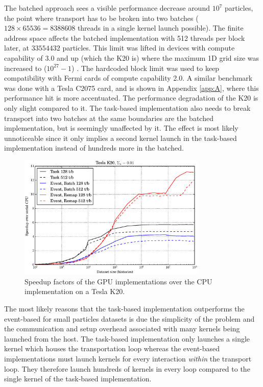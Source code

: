 The batched approach sees a visible performance decrease around $10^7$ particles, the point where transport has to be broken into two batches ($128\times65536=8388608$ threads in a single kernel launch possible).  The finite address space affects the batched implementation with 512 threads per block later, at $33554432$ particles.  This limit was lifted in devices with compute capability of 3.0 and up (which the K20 is) where the maximum 1D grid size was increased to ($10^{27}-1$) \cite{cuda}.  The hardcoded block limit was used to keep compatibility with Fermi cards of compute capability 2.0.  A similar benchmark was done with a Tesla C2075 card, and is shown in Appendix \ref{app:A}, where this performance hit is more accentuated.  The performance degradation of the K20 is only slight compared to it.   The task-based implementation also needs to break transport into two batches at the same boundaries are the batched implementation, but is seemingly unaffected by it.  The effect is most likely unnoticeable since it only implies a second kernel launch in the task-based implementation instead of hundreds more in the batched.

\begin{figure}[h!] 
  \centering
    \includegraphics[width=0.8\textwidth]{graphics/prelim_speedup_001_k20.eps}
     \caption{Speedup factors of the GPU implementations over the CPU implementation on a Tesla K20. \label{prelim_speedup_01} }
\end{figure}

The most likely reasons that the task-based implementation outperforms the event-based for small particles datasets is due the simplicity of the problem and the communication and setup overhead associated with many kernels being launched from the host.  The task-based implementation only launches a single kernel which houses the transportation loop whereas the event-based implementations must launch kernels for every interaction \emph{within} the transport loop.  They therefore launch hundreds of kernels in every loop compared to the single kernel of the task-based implementation.  

